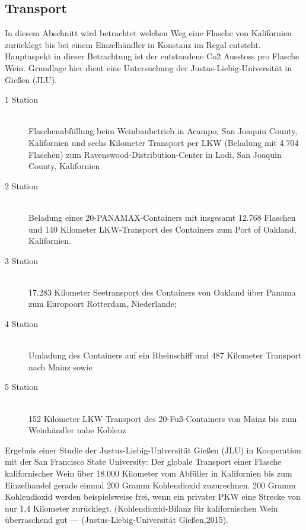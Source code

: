 \subsection{Transport}
In diesem Abschnitt wird betrachtet welchen Weg eine Flasche von Kalifornien zurücklegt bis bei einem Einzelhändler in Konstanz im Regal entsteht. Hauptaspekt in dieser Betrachtung ist der entstandene Co2 Ausstoss pro Flasche Wein. Grundlage hier dient eine Untersuchung der Justus-Liebig-Universität in Gießen (JLU). 
\begin{description}
	\item[1 Station]\hfill \\
	Flaschenabfüllung beim Weinbaubetrieb in Acampo, San Joaquin County, 			Kalifornien und sechs Kilometer Transport per LKW (Beladung mit 4.704 			Flaschen) zum Ravenswood-Distribution-Center in Lodi, San Joaquin 				County, Kalifornien
	\item[2 Station]\hfill \\
	Beladung eines 20-PANAMAX-Containers mit insgesamt 12.768 Flaschen 			und 140 Kilometer LKW-Transport des Containers zum Port of Oakland, 			Kalifornien.
	\item[3 Station]\hfill \\
		17.283 Kilometer Seetransport des Containers von Oakland über Panama 			zum Europoort Rotterdam, Niederlande;
	\item[4 Station]\hfill \\
		Umladung des Containers auf ein Rheinschiff und 487 Kilometer Transport 			nach Mainz sowie	
	\item[5 Station]\hfill \\ 
	152 Kilometer LKW-Transport des 20-Fuß-Containers von Mainz bis zum 			Weinhändler nahe Koblenz
\end{description}

Ergebnis einer Studie der Justus-Liebig-Universität Gießen (JLU) in Kooperation mit der San Francisco State University: Der globale Transport einer Flasche kalifornischer Wein über 18.000 Kilometer vom Abfüller in Kalifornien bis zum Einzelhandel gerade einmal 200 Gramm Kohlendioxid zuzurechnen. 200 Gramm Kohlendioxid werden beispielsweise frei, wenn ein privater PKW eine Strecke von nur 1,4 Kilometer zurücklegt.  (Kohlendioxid-Bilanz für kalifornischen Wein überraschend gut — (Justus-Liebig-Universität Gießen,2015). 


